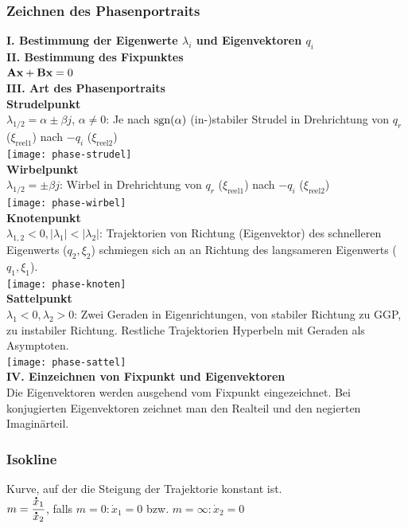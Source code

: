 \documentclass[fs, footer]{latex4ei}
\begin{document}
\begin{multicols*}{4}
	\subsubsection{Zeichnen des Phasenportraits}
		\textbf{I. Bestimmung der Eigenwerte $\lambda_i$ und Eigenvektoren $q_i$}\\
		\textbf{II. Bestimmung des Fixpunktes}\\
		$\textbf{A}\textbf{x} + \textbf{B}\textbf{x} = 0$\\
		\textbf{III. Art des Phasenportraits}\\
		\textbf{Strudelpunkt}\\
		$\lambda_{1/2} = \alpha \pm \beta j$, $\alpha \neq 0$: Je nach $\operatorname{sgn}(\alpha)$ (in-)stabiler Strudel in Drehrichtung von $q_r$ ($\xi_{\text{reel}1}$) nach $-q_i$ ($\xi_{\text{reel}2}$)\\
		\texttt{[image: phase-strudel]}\\
		\textbf{Wirbelpunkt}\\
		$\lambda_{1/2} = \pm \beta j$: Wirbel in Drehrichtung von $q_r$ ($\xi_{\text{reel}1}$) nach $-q_i$ ($\xi_{\text{reel}2}$)\\
		\texttt{[image: phase-wirbel]}\\
		\textbf{Knotenpunkt}\\
		$\lambda_{1,2} < 0, |\lambda_1| < |\lambda_2|$: Trajektorien von Richtung (Eigenvektor) des schnelleren Eigenwerts ($q_2, \xi_2$) schmiegen sich an an Richtung des langsameren Eigenwerts ($q_1, \xi_1$).\\
		\texttt{[image: phase-knoten]}\\
		\textbf{Sattelpunkt}\\
		$\lambda_1 < 0, \lambda_2 > 0$: Zwei Geraden in Eigenrichtungen, von stabiler Richtung zu GGP, zu instabiler Richtung. Restliche Trajektorien Hyperbeln mit Geraden als Asymptoten.\\
		\texttt{[image: phase-sattel]}\\
		\textbf{IV. Einzeichnen von Fixpunkt und Eigenvektoren}\\
		Die Eigenvektoren werden ausgehend vom Fixpunkt eingezeichnet. Bei konjugierten Eigenvektoren zeichnet man den Realteil und den negierten Imaginärteil.\\
		\subsubsection{Isokline}
		Kurve, auf der die Steigung der Trajektorie konstant ist.\\
		$m = \dfrac {\accentset{\mbox{\textrm{\large\bfseries .}} }{x}_1}{\accentset{\mbox{\textrm{\large\bfseries .}} }{x}_2}$, falls $m = 0: \dot x_1 = 0$ bzw. $m = \infty: \dot x_2 = 0$

\end{multicols*}
\end{document}
